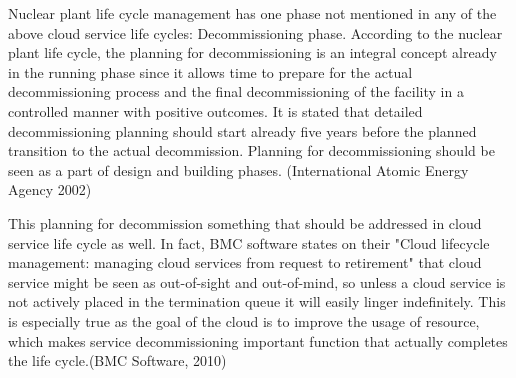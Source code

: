 \documentclass{article}
\begin{document}
\par
Nuclear plant life cycle management has one phase not mentioned in any of the above cloud service life cycles: Decommissioning phase. According to the nuclear plant life cycle, the planning for decommissioning is an integral concept already in the running phase since it allows time to prepare for the actual decommissioning process and the final decommissioning of the facility in a controlled manner with positive outcomes. It is stated that detailed decommissioning planning should start already five years before the planned transition to the actual decommission. Planning for decommissioning should be seen as a part of design and building phases. (International Atomic Energy Agency 2002)
\par
This planning for decommission something that should be addressed in cloud service life cycle as well. In fact, BMC software states on their "Cloud lifecycle management: managing cloud services from request to retirement" that cloud service might be seen as out-of-sight and out-of-mind, so unless a cloud service is not actively placed in the termination queue it will easily linger indefinitely. This is especially true as the goal of the cloud is to improve the usage of resource, which makes service decommissioning important function that actually completes the life cycle.(BMC Software, 2010)
\end{document}
